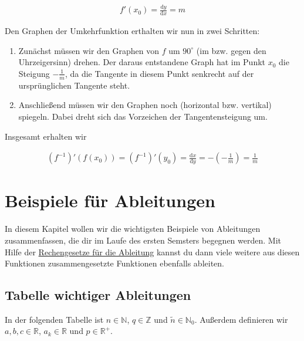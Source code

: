 \documentclass[fontsize=9pt,
               parskip=half-,
               DIV=14,
               listof=chapterentry,
               tocflat]{scrbook}
\begin{document}
\begin{align*}
f'(x_{0})={\frac {\mathrm {d} y}{\mathrm {d} x}}=m
\end{align*}

Den Graphen der Umkehrfunktion erthalten wir nun in zwei Schritten:

\begin{enumerate}
\item Zunächst müssen wir den Graphen von $f$ um $90^{\circ }$ (im bzw. gegen den Uhrzeigersinn) drehen. Der daraus entstandene Graph hat im Punkt $x_{0}$ die Steigung $-{\tfrac {1}{m}}$, da die Tangente in diesem Punkt senkrecht auf der ursprünglichen Tangente steht.
\item Anschließend müssen wir den Graphen noch (horizontal bzw. vertikal) spiegeln. Dabei dreht sich das Vorzeichen der Tangentensteigung um.
\end{enumerate}

Insgesamt erhalten wir

\begin{align*}
(f^{-1})'(f(x_{0}))=(f^{-1})'(y_{0})={\frac {\mathrm {d} x}{\mathrm {d} y}}=-\left(-{\frac {1}{m}}\right)={\frac {1}{m}}
\end{align*}

\chapter{Beispiele für Ableitungen}

In diesem Kapitel wollen wir die wichtigsten Beispiele von Ableitungen zusammenfassen, die dir im Laufe des ersten Semsters begegnen werden. Mit Hilfe der \href{https://de.wikibooks.org/wiki/Mathe\_für\_Nicht-Freaks:\_Rechengesetze\_für\_die\_Ableitung}
{Rechengesetze für die Ableitung} kannst du dann viele weitere aus diesen Funktionen zusammengesetzte Funktionen ebenfalls ableiten.

\section{Tabelle wichtiger Ableitungen}

In der folgenden Tabelle ist $n\in \mathbb {N} $, $q\in \mathbb {Z} $ und ${\tilde {n}}\in \mathbb {N} _{0}$. Außerdem definieren wir $a,b,c\in \mathbb {R} $, $a_{k}\in \mathbb {R} $ und $p\in \mathbb {R} ^{+}$.


\renewcommand{\arraystretch}{1.5}
\end{document}
